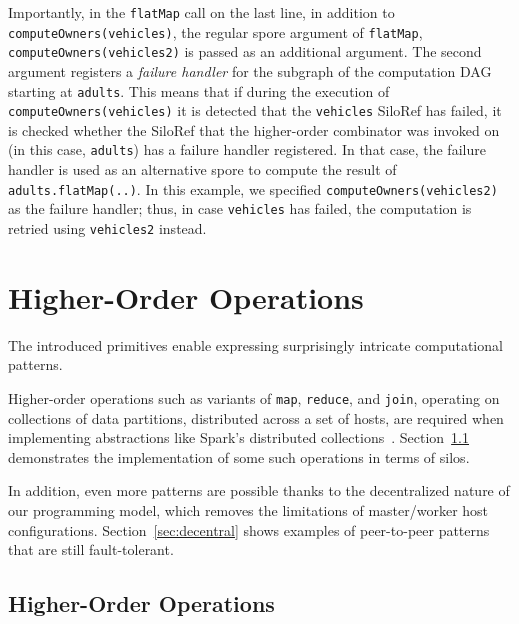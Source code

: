 \documentclass[preprint]{sigplanconf}
\theoremstyle{definition}
\theoremstyle{definition}
\begin{document}
Importantly, in the \verb|flatMap| call on the last line, in addition to
\verb|computeOwners(vehicles)|, the regular spore argument of \verb|flatMap|,
\verb|computeOwners(vehicles2)| is passed as an additional argument. The
second argument registers a \emph{failure handler} for the subgraph of the
computation DAG starting at \verb|adults|. This means that if during the
execution of \verb|computeOwners(vehicles)| it is detected that the
\verb|vehicles| SiloRef has failed, it is checked whether the SiloRef that the
higher-order combinator was invoked on (in this case, \verb|adults|) has a
failure handler registered. In that case, the failure handler is used as an
alternative spore to compute the result of \verb|adults.flatMap(..)|. In this
example, we specified \verb|computeOwners(vehicles2)| as the failure handler;
thus, in case \verb|vehicles| has failed, the computation is retried using
\verb|vehicles2| instead.





\section{Higher-Order Operations}
\label{sec:higher-order-operations}

The introduced primitives enable expressing surprisingly intricate
computational patterns.

Higher-order operations such as variants of \verb|map|, \verb|reduce|, and
\verb|join|, operating on collections of data partitions, distributed across a
set of hosts, are required when implementing abstractions like Spark's
distributed collections~\cite{Spark}. Section~\ref{sec:dist-coll} demonstrates
the implementation of some such operations in terms of silos.

In addition, even more patterns are possible thanks to the decentralized
nature of our programming model, which removes the limitations of master/worker
host configurations. Section~\ref{sec:decentral} shows examples of
peer-to-peer patterns that are still fault-tolerant.




\subsection{Higher-Order Operations}\label{sec:dist-coll}

\end{document}
